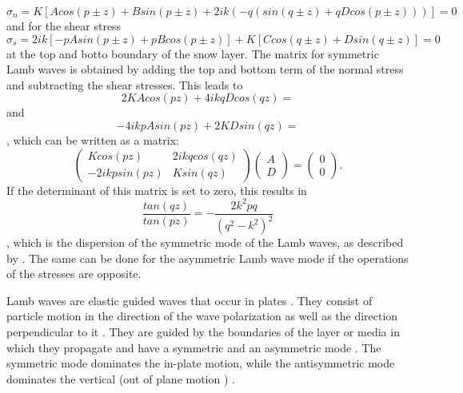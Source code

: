 \documentclass[10pt]{article}
\begin{document}
\begin{itemize}
\begin{equation}
    \sigma_n = K [A cos (p±z) + Bsin(p±z) + 2ik (-q(sin(q±z) + qDcos(p±z)))] = 0
  \end{equation} and for the shear stress \begin{equation}
    \sigma_s = 2ik[-pAsin(p±z) + pBcos(p±z)] + K[Ccos(q±z) + Dsin(q±z)] = 0
  \end{equation} at the top and botto boundary of the snow layer. The matrix for symmetric Lamb waves is obtained by adding the top and bottom term of the normal stress and subtracting the shear stresses. This leads to \begin{equation}
    2KAcos(pz) + 4ikqDcos(qz) =
  \end{equation} and \begin{equation}
    -4ikpAsin(pz) + 2KDsin(qz) =
  \end{equation}, which can be written as a matrix: \begin{equation}
    \begin{pmatrix}
      Kcos(pz) & 2ikqcos(qz) \\
      -2ikpsin(pz) & Ksin(qz)
    \end{pmatrix} \begin{pmatrix}
      A \\ D
    \end{pmatrix} = \begin{pmatrix}
      0 \\ 0
    \end{pmatrix}.
  \end{equation} If the determinant of this matrix is set to zero, this results in \begin{equation}
    \frac{tan(qz)}{tan(pz)} = -\frac{2k^2pq}{(q^2-k^2)^2}
  \end{equation}, which is the dispersion of the symmetric mode of the Lamb waves, as described by \cite{suFundamentalsAnalysisLamb2009}. The same can be done for the asymmetric Lamb wave mode if the operations of the stresses are opposite. \par

  Lamb waves are elastic guided waves that occur in plates \parencite{suFundamentalsAnalysisLamb2009}. They consist of particle motion in the direction of the wave polarization as well as the direction perpendicular to it \parencite{suFundamentalsAnalysisLamb2009}. They are guided by the boundaries of the layer or media in which they propagate and have a symmetric and an asymmetric mode \parencite{suFundamentalsAnalysisLamb2009}. The symmetric mode dominates the in-plate motion, while the antisymmetric mode dominates the vertical (out of plane motion ) \parencite{suFundamentalsAnalysisLamb2009}. \par


\end{itemize}
\end{document}
